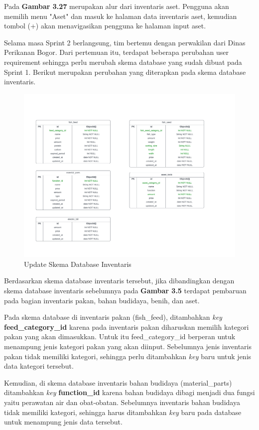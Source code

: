 \begin{enumerate}
\begin{enumerate}
		Pada \textbf{Gambar 3.27} merupakan alur dari inventaris aset. Pengguna akan memilih menu "Aset" dan masuk ke halaman data inventaris aset, kemudian tombol (+) akan menavigasikan pengguna ke halaman input aset.

		Selama masa Sprint 2 berlangsung, tim bertemu dengan perwakilan dari Dinas Perikanan Bogor. Dari pertemuan itu, terdapat beberapa perubahan user requirement sehingga perlu merubah skema database yang sudah dibuat pada Sprint 1. Berikut merupakan perubahan yang diterapkan pada skema database inventaris.

		\begin{figure}[H]
			\centering
			\includegraphics[width=1.15\textwidth]{gambar/sprint2/inventory_schema.png}
			\caption{Update Skema Database Inventaris}
		\end{figure}

		Berdasarkan skema database inventaris tersebut, jika dibandingkan dengan skema database inventaris sebelumnya pada \textbf{Gambar 3.5} terdapat pembaruan pada bagian inventaris pakan, bahan budidaya, benih, dan aset.

		Pada skema database di inventaris pakan (fish\_feed), ditambahkan \textit{key} \textbf{feed\_category\_id} karena pada inventaris pakan diharuskan memilih kategori pakan yang akan dimasukkan. Untuk itu feed\_category\_id berperan untuk menampung jenis kategori pakan yang akan diinput. Sebelumnya jenis inventaris pakan tidak memiliki kategori, sehingga perlu ditambahkan \textit{key} baru untuk jenis data kategori tersebut.

		Kemudian, di skema database inventaris bahan budidaya (material\_parts) ditambahkan \textit{key} \textbf{function\_id} karena bahan budidaya dibagi menjadi dua fungsi yaitu perawatan air dan obat-obatan. Sebelumnya inventaris bahan budidaya tidak memiliki kategori, sehingga harus ditambahkan \textit{key} baru pada database untuk menampung jenis data tersebut.


\end{enumerate}
\end{enumerate}
